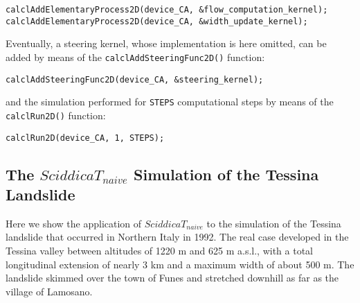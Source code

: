 \begin{lstlisting}
calclAddElementaryProcess2D(device_CA, &flow_computation_kernel);
calclAddElementaryProcess2D(device_CA, &width_update_kernel);
\end{lstlisting}

\noindent Eventually, a steering kernel, whose implementation is
here omitted, can be added by means of the
\verb'calclAddSteeringFunc2D()' function:

\begin{lstlisting}
calclAddSteeringFunc2D(device_CA, &steering_kernel);
\end{lstlisting}

\noindent and the simulation performed for \verb'STEPS'
computational steps by means of the \verb'calclRun2D()' function:

\begin{lstlisting}
calclRun2D(device_CA, 1, STEPS);
\end{lstlisting}

\subsection{The $SciddicaT_{naive}$ Simulation of the Tessina Landslide}
Here we show the application of $SciddicaT_{naive}$ to the
simulation of the Tessina landslide \cite{avolio2000simulation} that
occurred in Northern Italy in 1992. The real case developed in the
Tessina valley between altitudes of 1220 m and 625 m a.s.l., with a
total longitudinal extension of nearly 3 km and a maximum width of
about 500 m. The landslide skimmed over the town of Funes and
stretched downhill as far as the village of Lamosano.

